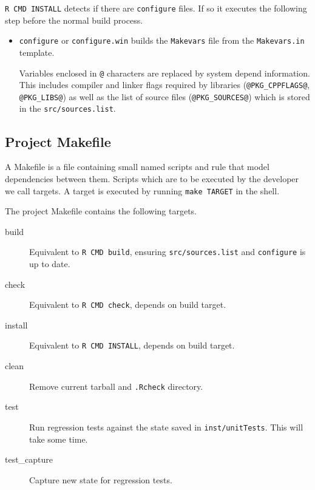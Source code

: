 \documentclass[12pt, a4paper]{article}
\renewcommand{\=}{\,=\,}
\newcommand{\+}{\,+\,}
\begin{document}
\texttt{R CMD INSTALL} detects if there are \texttt{configure} files. If so it
executes the following step before the normal build process.

\begin{itemize}

  \item \texttt{configure} or \texttt{configure.win} builds the
    \texttt{Makevars} file from the \texttt{Makevars.in} template.

    Variables enclosed in \texttt{@} characters are replaced by system depend
    information. This includes compiler and linker flags required by libraries
    (\texttt{@PKG\_CPPFLAGS@}, \texttt{@PKG\_LIBS@}) as well as the list of
    source files (\texttt{@PKG\_SOURCES@}) which is stored in the
    \texttt{src/sources.list}.

\end{itemize}

\subsection{Project Makefile}

A Makefile is a file containing small named scripts and rule that model
dependencies between them. Scripts which are to be executed by the developer
we call targets. A target is executed by running \verb|make TARGET| in the
shell.

The project Makefile contains the following targets.

\begin{description}
  \item[build] Equivalent to \texttt{R CMD build}, ensuring
    \texttt{src/sources.list} and \texttt{configure} is up to date.

  \item[check] Equivalent to \texttt{R CMD check}, depends on build target.

  \item[install] Equivalent to \texttt{R CMD INSTALL}, depends on build target.


  \item[clean] Remove current tarball and \texttt{.Rcheck} directory.

  \item[test] Run regression tests against the state saved in
    \texttt{inst/unitTests}. This will take some time.

  \item[test\_capture] Capture new state for regression tests.

\end{description}
\end{document}
